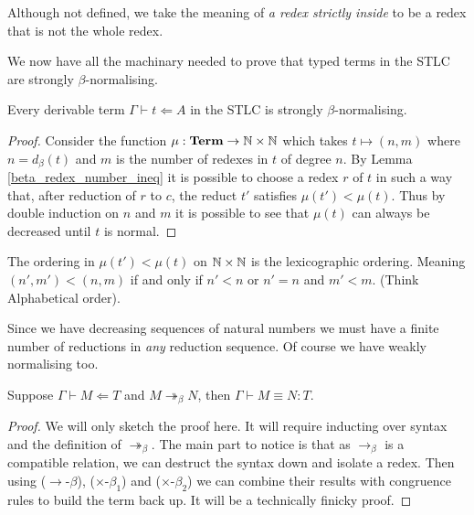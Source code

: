 \begin{remark}
    Although not defined, we take the meaning of \emph{a redex strictly inside} to be a redex that is not the whole redex.
\end{remark}

We now have all the machinary needed to prove that typed terms in the STLC are strongly $\beta$-normalising.

\begin{theorem}\label{beta_SN}
    Every derivable term $\Gamma \vdash t \Leftarrow A$ in the STLC is strongly $\beta$-normalising.
\end{theorem}

\begin{proof}
    Consider the function $\mu : \mathbf{Term} \to \mathbb{N} \times \mathbb{N}$ which takes $t \mapsto (n, m)$ where $n = d_{\beta}(t)$ and $m$ is the number of redexes in $t$ of degree $n$. By Lemma \ref{beta_redex_number_ineq} it is possible to choose a redex $r$ of $t$ in such a way that, after reduction of $r$ to $c$, the reduct $t'$ satisfies $\mu(t') < \mu(t)$. Thus by double induction on $n$ and $m$ it is possible to see that $\mu(t)$ can always be decreased until $t$ is normal.
\end{proof}

\begin{remark}
    The ordering in $\mu(t') < \mu(t)$ on $\mathbb{N} \times \mathbb{N} $ is the lexicographic ordering. Meaning $(n', m') < (n, m)$ if and only if $n' < n$ or $n'=n$ and $m' < m$. (Think Alphabetical order).
\end{remark}

\begin{remark}
    Since we have decreasing sequences of natural numbers we must have a finite number of reductions in \emph{any} reduction sequence. Of course we have weakly normalising too.
\end{remark}

\begin{lemma}\label{beta_coh}
    Suppose $\Gamma \vdash M \Leftarrow T$ and $M \twoheadrightarrow_{\beta} N$, then $\Gamma \vdash M \equiv N : T$.
\end{lemma}

\begin{proof}
    We will only sketch the proof here. It will require inducting over syntax and the definition of $\twoheadrightarrow_\beta$. The main part to notice is that as $\to_\beta$ is a compatible relation, we can destruct the syntax down and isolate a redex. Then using ($\to$-$\beta$), ($\times$-$\beta_1$) and ($\times$-$\beta_2$) we can combine their results with congruence rules to build the term back up. It will be a technically finicky proof.
\end{proof}

